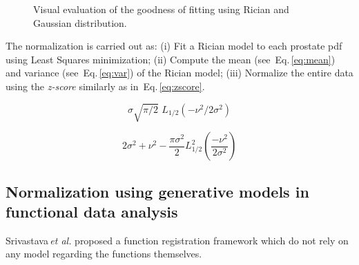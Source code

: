 \begin{figure}
  \centering
  \hfill
  \hfill
  \caption{Visual evaluation of the goodness of fitting using Rician and Gaussian distribution.}
  \label{fig:fitting}
\end{figure}

The normalization is carried out as: 
(i) Fit a Rician model to each prostate \ac{pdf} using Least Squares minimization; 
(ii) Compute the mean (see~Eq.\,\eqref{eq:mean}) and variance (see~Eq.\,\eqref{eq:var}) of the Rician model;
(iii) Normalize the entire data using the \textit{z-score} similarly as in~Eq.\,\eqref{eq:zscore}.

\begin{equation}
  \sigma  \sqrt{\pi/2}\,\,L_{1/2}(-\nu^2/2\sigma^2) 
  \label{eq:mean}
\end{equation}

\begin{equation}
  2\sigma^2+\nu^2-\frac{\pi\sigma^2}{2}L_{1/2}^2\left(\frac{-\nu^2}{2\sigma^2}\right) 
  \label{eq:var}
\end{equation}

\subsection{Normalization using generative models in functional data analysis}

Srivastava\,\textit{et al.} proposed a function registration framework which do not rely on any model regarding the functions themselves.

